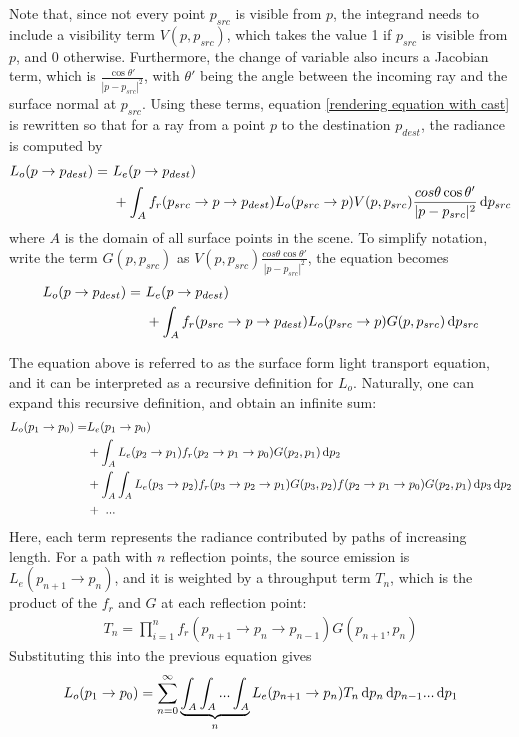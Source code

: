 Note that, since not every point $p_{src}$ is visible from $p$, the integrand needs to include a visibility term $V(p,p_{src})$, which takes the value 1 if $p_{src}$ is visible from $p$, and 0 otherwise. Furthermore, the change of variable also incurs a Jacobian term, which is $\frac{\cos\theta'}{|p-p_{src}|^2}$, with $\theta'$ being the angle between the incoming ray and the surface normal at $p_{src}$. Using these terms, equation \ref{rendering equation with cast} is rewritten so that for a ray from a point $p$ to the destination $p_{dest}$, the radiance is computed by
\begin{align*}
    L_o(p\to p_{dest}) =~ &L_e(p\to p_{dest}) \\
    &+ \int_A f_r(p_{src}\to p\to p_{dest}) L_o(p_{src}\to p)  V(p,p_{src}) \frac{cos\theta\cos\theta'}{|p-p_{src}|^2} \,\mathrm{d} p_{src}
\end{align*} 
where $A$ is the domain of all surface points in the scene. To simplify notation, write the term $G(p,p_{src})$ as $V(p,p_{src}) \frac{cos\theta\cos\theta'}{|p-p_{src}|^2}$, the equation becomes
\begin{align*}
    L_o(p\to p_{dest}) =~ &L_e(p\to p_{dest}) \\
    &+ \int_A f_r(p_{src}\to p\to p_{dest}) L_o(p_{src}\to p)  G(p,p_{src})  \,\mathrm{d} p_{src}
\end{align*} 

The equation above is referred to as the surface form light transport equation, and it can be interpreted as a recursive definition for $L_o$. Naturally, one can expand this recursive definition, and obtain an infinite sum:
\begin{align*}
    L_o(p_1\to p_0) =
    &L_e(p_1\to p_0)\\
    &+ \int_A L_e(p_2\to p_1)f_r(p_2\to p_1\to p_0)G(p_2,p_1) \,\mathrm{d} p_2\\
    &+ \int_A \int_A L_e(p_3\to p_2)f_r(p_3\to p_2\to p_1) G(p_3,p_2)f(p_2\to p_1\to p_0)G(p_2,p_1) \,\mathrm{d} p_3 \,\mathrm{d} p_2\\
    &+~...
\end{align*}
Here, each term represents the radiance contributed by paths of increasing length. For a path with $n$ reflection points, the source emission is $L_e(p_{n+1}\to p_{n})$, and it is weighted by a throughput term $T_n$, which is the product of the $f_r$ and $G$ at each reflection point:
\begin{align*}
    T_n = \prod_{i=1}^{n} f_r(p_{n+1}\to p_n\to p_{n-1})G(p_{n+1},p_n)
\end{align*}
Substituting this into the previous equation gives
\begin{align*}
    L_o(p_1\to p_0) = \sum_{n=0}^{\infty} \underbrace{\int_A \int_A...\int_A}_{n} L_e(p_{n+1}\to p_{n})T_n \,\mathrm{d} p_{n}\,\mathrm{d} p_{n-1}...\,\mathrm{d} p_1
\end{align*}


